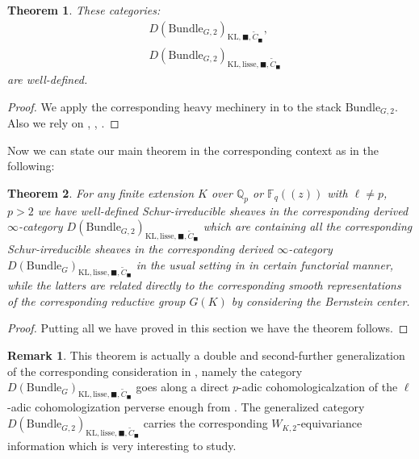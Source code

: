 \documentclass[12pt]{book}
\newtheorem{theorem}{Theorem}
\theoremstyle{definition}
\newtheorem{remark}{Remark}
\begin{document}
\begin{theorem}
These categories:
\begin{align}
&D(\mathrm{Bundle}_{G,2})_{\text{KL},\blacksquare,\widetilde{C}_\blacksquare},\\
&D(\mathrm{Bundle}_{G,2})_{\text{KL},\mathrm{lisse},\blacksquare,\widetilde{C}_\blacksquare}
\end{align}
are well-defined.
\end{theorem}

\begin{proof}
We apply the corresponding heavy mechinery in \cite[Chapter V, Chapter VII]{FS} to the stack $\mathrm{Bundle}_{G,2}$. Also we rely on \cite{SchIII}, \cite{CSI}, \cite{CSII}.
\end{proof}

Now we can state our main theorem in the corresponding context as in the following:

\begin{theorem}
For any finite extension $K$ over $\mathbb{Q}_p$ or $\mathbb{F}_q((z))$ with $\ell\neq p$, $p>2$ we have well-defined Schur-irreducible sheaves in the corresponding derived $\infty$-category $D(\mathrm{Bundle}_{G,2})_{\text{KL},\mathrm{lisse},\blacksquare,\widetilde{C}_\blacksquare}$ which are containing all the corresponding Schur-irreducible sheaves in the corresponding derived $\infty$-category $D(\mathrm{Bundle}_{G})_{\text{KL},\mathrm{lisse},\blacksquare,\widetilde{C}_\blacksquare}$ in the usual setting in \cite{FS} in certain functorial manner, while the latters are related directly to the corresponding smooth representations of the corresponding reductive group $G(K)$ by considering the Bernstein center.
\end{theorem}

\begin{proof}
Putting all we have proved in this section we have the theorem follows.
\end{proof}



\begin{remark}
This theorem is actually a double and second-further generalization of the corresponding consideration in \cite{FS}, namely the category $D(\mathrm{Bundle}_{G})_{\text{KL},\mathrm{lisse},\blacksquare,\widetilde{C}_\blacksquare}$ goes along a direct $p$-adic cohomologicalzation of the $\ell$-adic cohomologization perverse enough from \cite{FS}. The generalized category $D(\mathrm{Bundle}_{G,2})_{\text{KL},\mathrm{lisse},\blacksquare,\widetilde{C}_\blacksquare}$ carries the corresponding $W_{K,2}$-equivariance information which is very interesting to study.
\end{remark}
\end{document}
